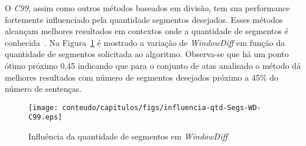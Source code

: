 




O \textit{C99}, assim como outros métodos baseados em divisão, tem sua performance fortemente influenciado pela quantidade segmentos desejados. Esses métodos alcançam melhores resultados em contextos onde a quantidade de segmentos é conhecida~\cite{Bokaei2015,Ferret2009,Kern2009,Naili2016}. Na Figura~\ref{fig:influencia-NSegs-WD} é mostrado a variação de \textit{WindowDiff} em função da quantidade de segmentos solicitada ao algoritmo. Observa-se que há um ponto ótimo próximo 0,45 indicando que para o conjunto de atas analisado o método dá melhores resultados com número de segmentos desejados próximo a 45\% do número de sentenças.

  \begin{figure}[!h]
	  \centering
	  \texttt{[image: conteudo/capitulos/figs/influencia-qtd-Segs-WD-C99.eps]}
	  \caption{Influência da quantidade de segmentos em \textit{WindowDiff}}
	  \label{fig:influencia-NSegs-WD}
  \end{figure}






















